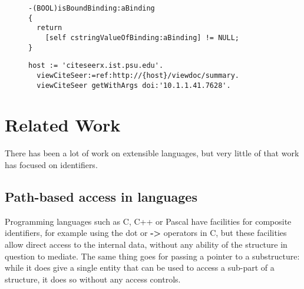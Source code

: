 \documentclass[preprint,authoryear]{acm_proc_article-sp}
\begin{document}
\begin{figure}[htbp]
\begin{lstlisting}[style=L,label=hasValue-env,caption=Checking for presence of value in env: scheme.]
-(BOOL)isBoundBinding:aBinding
{
  return 
    [self cstringValueOfBinding:aBinding] != NULL;
}
\end{lstlisting}
\end{figure}


\begin{figure}[htbp]
\begin{lstlisting}[style=L,label=url-args,caption=URL arguments via reference and higher order message.]
  host := 'citeseerx.ist.psu.edu'.
  viewCiteSeer:=ref:http://{host}/viewdoc/summary.
  viewCiteSeer getWithArgs doi:'10.1.1.41.7628'.
\end{lstlisting}
\end{figure}


\section{Related Work}
\label{related-work}

There has been a lot of work on extensible languages, but very little of that work 
has focused on identifiers.  

\subsection{Path-based access in languages}

Programming languages such as C, C++ or Pascal have facilities for composite
identifiers, for example using the dot or {\bf -> } operators in C, but these facilities allow
direct access to the internal data, without any ability of the structure in question to 
mediate.  The same thing goes for passing a pointer to a substructure:  while it
does give a single entity that can be used to access a sub-part of a structure, it
does so without any access controls.
\end{document}
